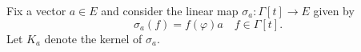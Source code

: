 Fix a vector $a \in E$ and consider the linear map $\sigma_a: \Gamma[t] \rightarrow E$ given by
$$\sigma_a(f) = f(\varphi)a \quad f \in \Gamma[t].$$
Let $K_a$ denote the kernel of $\sigma_a$.
